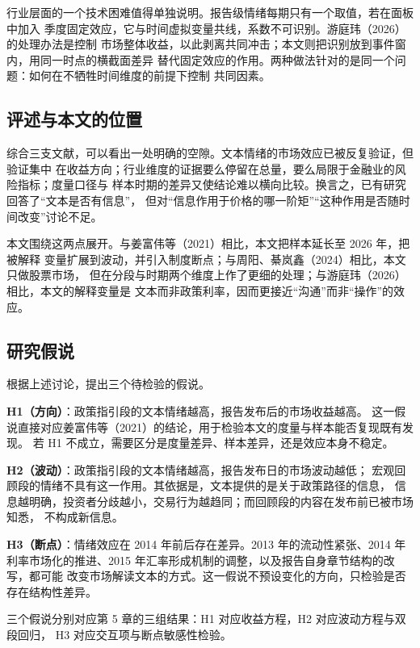 行业层面的一个技术困难值得单独说明。报告级情绪每期只有一个取值，若在面板中加入
季度固定效应，它与时间虚拟变量共线，系数不可识别。游庭玮（2026）的处理办法是控制
市场整体收益，以此剥离共同冲击；本文则把识别放到事件窗内，用同一时点的横截面差异
替代固定效应的作用。两种做法针对的是同一个问题：如何在不牺牲时间维度的前提下控制
共同因素。

\subsection{评述与本文的位置}

综合三支文献，可以看出一处明确的空隙。文本情绪的市场效应已被反复验证，但验证集中
在收益方向；行业维度的证据要么停留在总量，要么局限于金融业的风险指标；度量口径与
样本时期的差异又使结论难以横向比较。换言之，已有研究回答了“文本是否有信息”，
但对“信息作用于价格的哪一阶矩”“这种作用是否随时间改变”讨论不足。

本文围绕这两点展开。与姜富伟等（2021）相比，本文把样本延长至 2026 年，把被解释
变量扩展到波动，并引入制度断点；与周阳、綦岚鑫（2024）相比，本文只做股票市场，
但在分段与时期两个维度上作了更细的处理；与游庭玮（2026）相比，本文的解释变量是
文本而非政策利率，因而更接近“沟通”而非“操作”的效应。

\subsection{研究假说}

根据上述讨论，提出三个待检验的假说。

\textbf{H1（方向）}：政策指引段的文本情绪越高，报告发布后的市场收益越高。
这一假说直接对应姜富伟等（2021）的结论，用于检验本文的度量与样本能否复现既有发现。
若 H1 不成立，需要区分是度量差异、样本差异，还是效应本身不稳定。

\textbf{H2（波动）}：政策指引段的文本情绪越高，报告发布日的市场波动越低；
宏观回顾段的情绪不具有这一作用。其依据是，文本提供的是关于政策路径的信息，
信息越明确，投资者分歧越小，交易行为越趋同；而回顾段的内容在发布前已被市场知悉，
不构成新信息。

\textbf{H3（断点）}：情绪效应在 2014 年前后存在差异。2013 年的流动性紧张、2014 年
利率市场化的推进、2015 年汇率形成机制的调整，以及报告自身章节结构的改写，都可能
改变市场解读文本的方式。这一假说不预设变化的方向，只检验是否存在结构性差异。

三个假说分别对应第 5 章的三组结果：H1 对应收益方程，H2 对应波动方程与双段回归，
H3 对应交互项与断点敏感性检验。
